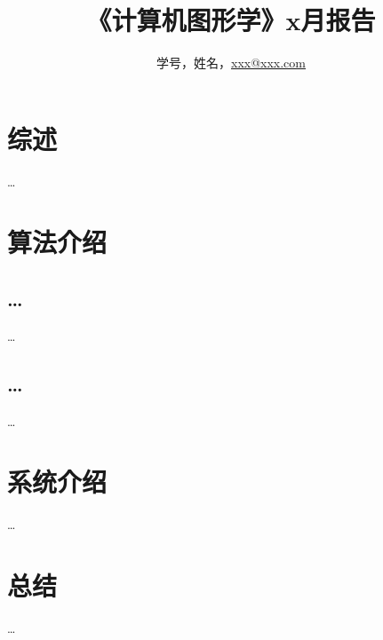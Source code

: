 \documentclass[a4paper,UTF8]{article}
\theoremstyle{definition}
\begin{document}
\title{\textbf{《计算机图形学》x月报告}}
\author{学号，姓名，\href{mailto:xxx@xxx.com}{xxx@xxx.com}}
\maketitle

\section{综述}
\dots

\section{算法介绍}
\subsection{\dots}
\dots
\subsection{\dots}
\dots
		
\section{系统介绍}
\dots

\section{总结}
\dots

%

\end{document}
